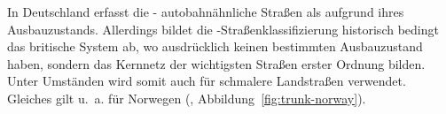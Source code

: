 \documentclass[../main/thesis.tex]{subfiles}
\begin{document}

In Deutschland erfasst die \osm- autobahnähnliche Straßen als  aufgrund ihres Ausbauzustands.
Allerdings bildet die \osm-Straßenklassifizierung historisch bedingt das britische System ab, wo  ausdrücklich keinen bestimmten Ausbauzustand haben, sondern das Kernnetz der wichtigsten Straßen erster Ordnung bilden.
Unter Umständen wird  somit auch für schmalere Landstraßen verwendet.
Gleiches gilt u.~a. für Norwegen (, Abbildung~\ref{fig:trunk-norway}). 




\end{document}
